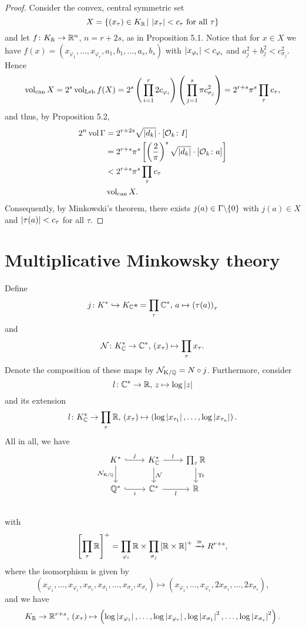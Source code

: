 \begin{proof}
Consider the convex, central symmetric set
\[ X = \left\{ (x_\tau) \in K_{\mathbb{R}} \, | \, \left|{x_\tau}\right| < c_\tau \text{ for all } \tau
\right\}
\]
and let $f \colon K_{\mathbb{R}} \to \mathbb{R}^n$, $n=r+2s$, as in Proposition 5.1. Notice that for $x \in X$ we have $f(x) = \left( x_{\varphi_1}, \dots, x_{\varphi_r}, a_1, b_1, \dots, a_s, b_s\right)$ with $\left|{x_{\varphi_i}}\right| < c_{\varphi_i}$ and $a_j^2+b_j^2 < c_{\sigma_j}^2$. Hence
\[ \operatorname{\operatorname{vol}_{can}} X = 2^s \operatorname{\operatorname{vol}_{\operatorname{Leb}}} f(X)
=2^s \left( \, \prod_{i=1}^r 2 c_{\varphi_i}  \right) \left(\, \prod_{j=1}^s \pi c_{\sigma_j}^2  \right)
=2^{r+s} \pi^s \prod_\tau c_\tau,
\]
and thus, by Proposition 5.2,
\begin{align*}
2^n \operatorname{vol} \Gamma 
&= 2^{r+2s} \sqrt{\left|{d_k}\right|} \cdot [\mathcal{O}_k\colon I] \\
&= 2^{r+s} \pi^s \left[\left(\frac{2}{\pi}\right)^s \sqrt{\left|{d_k}\right|} \cdot [\mathcal{O}_k\colon a]\right] \\
&< 2^{r+s} \pi^s \prod_\tau c_\tau \\
&\operatorname{\operatorname{vol}_{can}} X.
\end{align*}
Consequently, by Minkowski's theorem, there exists $j(a) \in \Gamma \backslash \{0\}$ with $j(a) \in X$ and $\left|{\tau(a)}\right| < c_\tau$ for all $\tau$.
\end{proof}


\section*{Multiplicative Minkowsky theory}
Define
\[ j \colon K^* \hookrightarrow K_{\mathbb{C}}* = \prod_\tau \mathbb{C}^*, \,
a \mapsto \left(\tau(a)\right)_\tau
\]
and
\[ \operatorname{\mathcal{N}} \colon K_{\mathbb{C}}^* \to \mathbb{C}^*, \, \left(x_\tau\right) \mapsto \prod_\tau x_\tau.
\]
Denote the composition of these maps by $\operatorname{\mathcal{N}_{K/\mathbb{Q}}} = N \circ j$. Furthermore, consider
\[ l \colon \mathbb{C}^* \to \mathbb{R}, \, z \mapsto \log\left|{z}\right|
\]
and its extension
\[ l \colon K_{\mathbb{C}}^* \to \prod_\tau \mathbb{R}, \, \left(x_\tau\right) \mapsto\left( 
\log\left|{x_{\tau_1}}\right|, \dots, \log\left|{x_{\tau_n}}\right|\right).
\]
All in all, we have
\[\begin{tikzcd}
K^*
	\arrow[hook]{r}{j}
	\arrow[swap]{d}{\NormKQ}
&K_\C^*
	\arrow[]{r}{l}
	\arrow[]{d}{\Norm}
&\prod_\tau \R
	\arrow[]{d}{\Tr} 
\\
\Q^*
	\arrow[swap, hook]{r}{i}
&\C^*
	\arrow[swap]{r}{l}
&\R\\
\end{tikzcd}
\]
with 
\[ \left[\prod_\tau \mathbb{R}\right]^+ 
= \prod_{\varphi_i} \mathbb{R} \times \prod_{\sigma_j} \left[\mathbb{R}\times\mathbb{R}\right]^+ 
\xrightarrow{\cong} R^{r+s},
\]
where the isomorphism is given by
\[ \left( x_{\varphi_1}, \dots, x_{\varphi_r}, x_{\sigma_1}, x_{\overline{\sigma_1}}, \dots, x_{\sigma_s}, x_{\overline{\sigma_s}} \right) \mapsto 
\left( x_{\varphi_1}, \dots, x_{\varphi_r}, 2 x_{\sigma_1}, \dots, 2x_{\sigma_s} \right),
\]
and we have
\[ K_{\mathbb{R}} \to \mathbb{R}^{r+s}, \, \left(x_\tau\right) \mapsto
\left( \log\left|{x_{\varphi_1}}\right|, \dots, \log\left|{x_{\varphi_r}}\right|, \log\left|{x_{\sigma_1}}\right|^2, \dots, \log\left|{x_{\sigma_s}}\right|^2  \right).
\]




